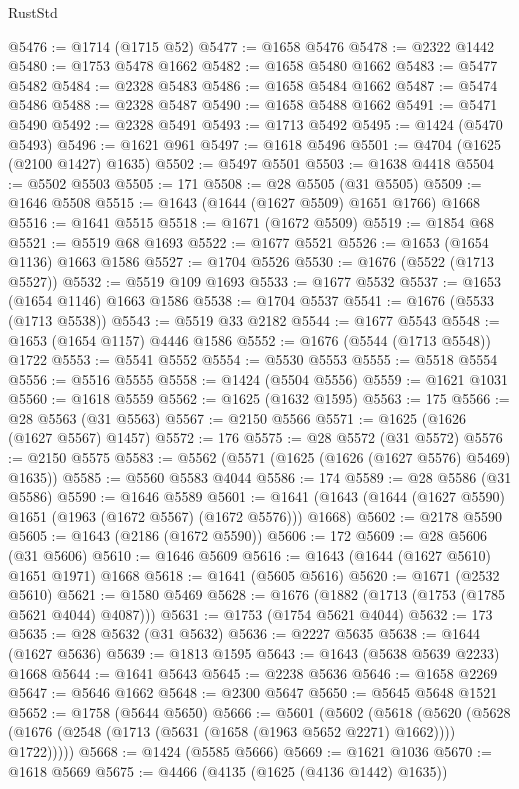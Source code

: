 \begin{lexlean}{RustStd}
\begin{coremodule}
@5476 := @1714 (@1715 @52)
@5477 := @1658 @5476
@5478 := @2322 @1442
@5480 := @1753 @5478 @1662
@5482 := @1658 @5480 @1662
@5483 := @5477 @5482
@5484 := @2328 @5483
@5486 := @1658 @5484 @1662
@5487 := @5474 @5486
@5488 := @2328 @5487
@5490 := @1658 @5488 @1662
@5491 := @5471 @5490
@5492 := @2328 @5491
@5493 := @1713 @5492
@5495 := @1424 (@5470 @5493)
@5496 := @1621 @961
@5497 := @1618 @5496
@5501 := @4704 (@1625 (@2100 @1427) @1635)
@5502 := @5497 @5501
@5503 := @1638 @4418
@5504 := @5502 @5503
@5505 := 171
@5508 := @28 @5505 (@31 @5505)
@5509 := @1646 @5508
@5515 := @1643 (@1644 (@1627 @5509) @1651 @1766) @1668
@5516 := @1641 @5515
@5518 := @1671 (@1672 @5509)
@5519 := @1854 @68
@5521 := @5519 @68 @1693
@5522 := @1677 @5521
@5526 := @1653 (@1654 @1136) @1663 @1586
@5527 := @1704 @5526
@5530 := @1676 (@5522 (@1713 @5527))
@5532 := @5519 @109 @1693
@5533 := @1677 @5532
@5537 := @1653 (@1654 @1146) @1663 @1586
@5538 := @1704 @5537
@5541 := @1676 (@5533 (@1713 @5538))
@5543 := @5519 @33 @2182
@5544 := @1677 @5543
@5548 := @1653 (@1654 @1157) @4446 @1586
@5552 := @1676 (@5544 (@1713 @5548)) @1722
@5553 := @5541 @5552
@5554 := @5530 @5553
@5555 := @5518 @5554
@5556 := @5516 @5555
@5558 := @1424 (@5504 @5556)
@5559 := @1621 @1031
@5560 := @1618 @5559
@5562 := @1625 (@1632 @1595)
@5563 := 175
@5566 := @28 @5563 (@31 @5563)
@5567 := @2150 @5566
@5571 := @1625 (@1626 (@1627 @5567) @1457)
@5572 := 176
@5575 := @28 @5572 (@31 @5572)
@5576 := @2150 @5575
@5583 := @5562 (@5571 (@1625 (@1626 (@1627 @5576) @5469) @1635))
@5585 := @5560 @5583 @4044
@5586 := 174
@5589 := @28 @5586 (@31 @5586)
@5590 := @1646 @5589
@5601 := @1641 (@1643 (@1644 (@1627 @5590) @1651 (@1963 (@1672 @5567) (@1672 @5576))) @1668)
@5602 := @2178 @5590
@5605 := @1643 (@2186 (@1672 @5590))
@5606 := 172
@5609 := @28 @5606 (@31 @5606)
@5610 := @1646 @5609
@5616 := @1643 (@1644 (@1627 @5610) @1651 @1971) @1668
@5618 := @1641 (@5605 @5616)
@5620 := @1671 (@2532 @5610)
@5621 := @1580 @5469
@5628 := @1676 (@1882 (@1713 (@1753 (@1785 @5621 @4044) @4087)))
@5631 := @1753 (@1754 @5621 @4044)
@5632 := 173
@5635 := @28 @5632 (@31 @5632)
@5636 := @2227 @5635
@5638 := @1644 (@1627 @5636)
@5639 := @1813 @1595
@5643 := @1643 (@5638 @5639 @2233) @1668
@5644 := @1641 @5643
@5645 := @2238 @5636
@5646 := @1658 @2269
@5647 := @5646 @1662
@5648 := @2300 @5647
@5650 := @5645 @5648 @1521
@5652 := @1758 (@5644 @5650)
@5666 := @5601
    (@5602
      (@5618
        (@5620 (@5628 (@1676 (@2548 (@1713 (@5631 (@1658 (@1963 @5652 @2271) @1662)))) @1722)))))
@5668 := @1424 (@5585 @5666)
@5669 := @1621 @1036
@5670 := @1618 @5669
@5675 := @4466 (@4135 (@1625 (@4136 @1442) @1635))

\end{coremodule}
\end{lexlean}
